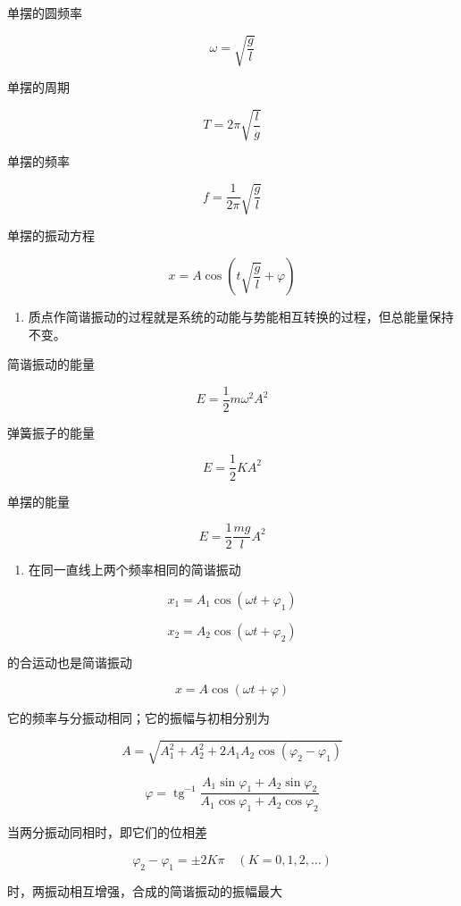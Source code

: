 单摆的圆频率

\[
\omega=\sqrt{\frac{g}{l}}
\]

单摆的周期

\[
T = 2 \pi \sqrt {\frac {l}{g}}
\]

单摆的频率

\[
f=\frac{1}{2\pi}\sqrt{\frac{g}{l}}
\]

单摆的振动方程

\[
x = A \cos \left(t \sqrt {\frac {g}{l}} + \varphi\right)
\]

\begin{enumerate}
\def\labelenumi{\arabic{enumi}.}
\setcounter{enumi}{5}
\tightlist
\item
  质点作简谐振动的过程就是系统的动能与势能相互转换的过程，但总能量保持不变。
\end{enumerate}

简谐振动的能量

\[
E = \frac {1}{2} m \omega^ {2} A ^ {2}
\]

弹簧振子的能量

\[
E=\frac12KA^2
\]

单摆的能量

\[
E=\frac12\frac{mg}{l}A^2
\]

\begin{enumerate}
\def\labelenumi{\arabic{enumi}.}
\setcounter{enumi}{6}
\tightlist
\item
  在同一直线上两个频率相同的简谐振动
\end{enumerate}

\[
x _ {1} = A _ {1} \cos (\omega t + \varphi_ {1})
\]

\[
x _ {2} = A _ {2} \cos (\omega t + \varphi_ {2})
\]

的合运动也是简谐振动

\[
x = A \cos (\omega t + \varphi)
\]

它的频率与分振动相同；它的振幅与初相分别为

\[
A = \sqrt {A _ {1} ^ {2} + A _ {2} ^ {2} + 2 A _ {1} A _ {2} \cos (\varphi_ {2} - \varphi_ {1})}
\]

\[
\varphi = \operatorname{tg} ^ {- 1} \frac {A _ {1} \sin \varphi_ {1} + A _ {2} \sin \varphi_ {2}}{A _ {1} \cos \varphi_ {1} + A _ {2} \cos \varphi_ {2}}
\]

当两分振动同相时，即它们的位相差

\[
\varphi_ {2} - \varphi_ {1} = \pm 2 K \pi \quad (K = 0, 1, 2, \dots)
\]

时，两振动相互增强，合成的简谐振动的振幅最大

